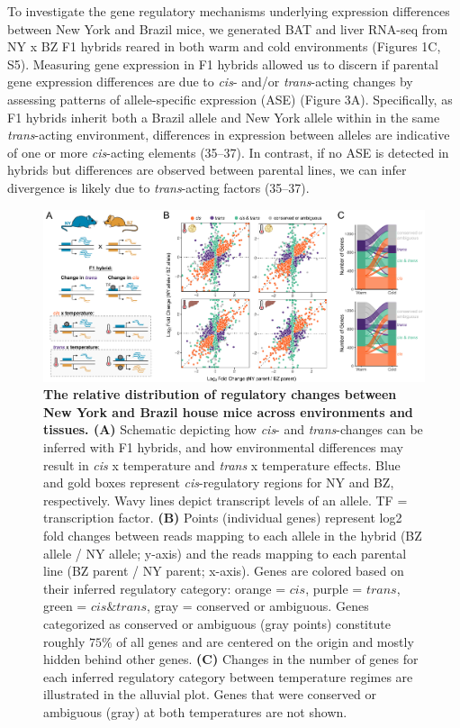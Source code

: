 \documentclass[9pt,twocolumn,twoside,lineno]{pnas-new}
\begin{document}
To investigate the gene regulatory mechanisms underlying expression
differences between New York and Brazil mice, we generated BAT and liver
RNA-seq from NY x BZ F1 hybrids reared in both warm and cold
environments (Figures 1C, S5). Measuring gene expression in F1 hybrids
allowed us to discern if parental gene expression differences are due to
\emph{cis}- and/or \emph{trans}-acting changes by assessing patterns of
allele-specific expression (ASE) (Figure 3A). Specifically, as F1
hybrids inherit both a Brazil allele and New York allele within in the
same \emph{trans}-acting environment, differences in expression between
alleles are indicative of one or more \emph{cis}-acting elements
(35--37). In contrast, if no ASE is detected in hybrids but differences
are observed between parental lines, we can infer divergence is likely
due to \emph{trans}-acting factors (35--37).

\begin{figure}[t]
  \includegraphics[width=\textwidth]{./figure_3.pdf}
  \caption{\textbf{The relative distribution of regulatory changes between New York and Brazil house mice across environments and tissues. (A)} Schematic depicting how \textit{cis}- and \textit{trans}-changes can be inferred with F1 hybrids, and how environmental differences may result in \textit{cis} x temperature and \textit{trans} x temperature effects. Blue and gold boxes represent \textit{cis}-regulatory regions for NY and BZ, respectively. Wavy lines depict transcript levels of an allele. TF = transcription factor. \textbf{(B)} Points (individual genes) represent log2 fold changes between reads mapping to each allele in the hybrid (BZ allele / NY allele; y-axis) and the reads mapping to each parental line (BZ parent / NY parent; x-axis). Genes are colored based on their inferred regulatory category: orange = $\textit{cis}$, purple = $\textit{trans}$, green = $\textit{cis}  \& \textit{trans}$, gray = conserved or ambiguous. Genes categorized as conserved or ambiguous (gray points) constitute roughly $75\%$ of all genes and are centered on the origin and mostly hidden behind other genes. \textbf{(C)} Changes in the number of genes for each inferred regulatory category between temperature regimes are illustrated in the alluvial plot. Genes that were conserved or ambiguous (gray) at both temperatures are not shown.}
\end{figure}
\end{document}
